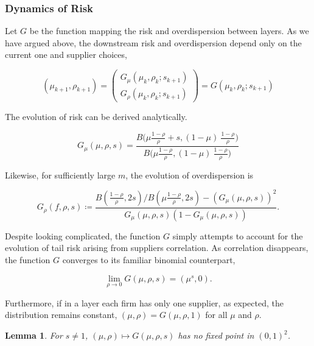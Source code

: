 \documentclass[american, abstract=on]{scrartcl}
\theoremstyle{plain}
\newtheorem{lemma}{Lemma}
\begin{document}
\subsubsection{Dynamics of Risk}

Let $G$ be the function mapping the risk and overdispersion between layers. As we have argued above, the downstream risk and overdispersion depend only on the current one and supplier choices,

\begin{equation}
  (\mu_{k + 1}, \rho_{k + 1}) =  \begin{pmatrix}
    G_{\mu}(\mu_k, \rho_k; s_{k + 1}) \\ G_{\rho}(\mu_k, \rho_k; s_{k + 1})
  \end{pmatrix} = G(\mu_k, \rho_k; s_{k + 1})
\end{equation}

The evolution of risk can be derived analytically.

\begin{equation}
  G_\mu(\mu, \rho, s) = \frac{B\Big( \mu \frac{1 - \rho}{\rho} + s, (1 - \mu) \  \frac{1 - \rho}{\rho} \Big)}{B\Big( \mu \frac{1 - \rho}{\rho}, (1 - \mu) \ \frac{1 - \rho}{\rho} \Big)}
\end{equation}

Likewise, for sufficiently large $m$, the evolution of overdispersion is

\begin{equation}
  G_\rho(f, \rho, s) \coloneqq  \frac{ B\left(\frac{1 - \rho}{\rho}, 2s \right) \Big/ B\left(\mu \frac{1 - \rho}{\rho}, 2s \right) - (G_\mu(\mu, \rho, s))^2}{G_\mu(\mu, \rho, s) (1 - G_\mu(\mu, \rho, s))}.
\end{equation}

Despite looking complicated, the function $G$ simply attempts to account for the evolution of tail risk arising from suppliers correlation. As correlation disappears, the function $G$ converges to its familiar binomial counterpart,

\begin{equation}
  \lim_{\rho \rightarrow 0} G(\mu, \rho, s) = (\mu^{s}, 0).
\end{equation}

Furthermore, if in a layer each firm has only one supplier, as expected, the distribution remains constant, $(\mu, \rho) = G(\mu, \rho, 1)$ for all $\mu$ and $\rho$.

\begin{lemma}
  For $s \neq 1$, $(\mu, \rho) \mapsto G(\mu, \rho, s)$ has no fixed point in $(0, 1)^2$.
\end{lemma}
\end{document}
